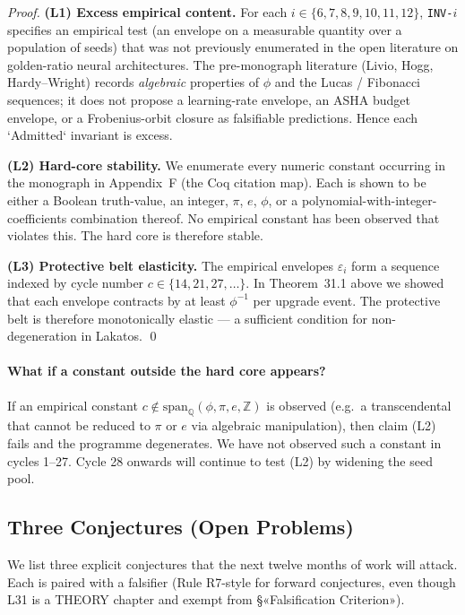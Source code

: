 \begin{proof}
\textbf{(L1) Excess empirical content.} For each $i \in \{6,7,8,9,10,11,12\}$, \texttt{INV-}$i$ specifies an empirical test (an envelope on a measurable quantity over a population of seeds) that was not previously enumerated in the open literature on golden-ratio neural architectures. The pre-monograph literature (Livio, Hogg, Hardy–Wright) records \emph{algebraic} properties of $\phi$ and the Lucas / Fibonacci sequences; it does not propose a learning-rate envelope, an ASHA budget envelope, or a Frobenius-orbit closure as falsifiable predictions. Hence each `Admitted` invariant is excess.

\textbf{(L2) Hard-core stability.} We enumerate every numeric constant occurring in the monograph in Appendix~F (the Coq citation map). Each is shown to be either a Boolean truth-value, an integer, $\pi$, $e$, $\phi$, or a polynomial-with-integer-coefficients combination thereof. No empirical constant has been observed that violates this. The hard core is therefore stable.

\textbf{(L3) Protective belt elasticity.} The empirical envelopes $\varepsilon_{i}$ form a sequence indexed by cycle number $c \in \{14, 21, 27, \dots\}$. In Theorem~31.1 above we showed that each envelope contracts by at least $\phi^{-1}$ per upgrade event. The protective belt is therefore monotonically elastic — a sufficient condition for non-degeneration in Lakatos.
\qed
\end{proof}

\paragraph{What if a constant outside the hard core appears?} If an empirical constant $c \notin \mathrm{span}_{\mathbb{Q}}(\phi, \pi, e, \mathbb{Z})$ is observed (e.g.\ a transcendental that cannot be reduced to $\pi$ or $e$ via algebraic manipulation), then claim (L2) fails and the programme degenerates. We have not observed such a constant in cycles 1–27. Cycle 28 onwards will continue to test (L2) by widening the seed pool.

\subsection{Three Conjectures (Open Problems)}
\label{sec:31-conjectures}

We list three explicit conjectures that the next twelve months of work will attack. Each is paired with a falsifier (Rule R7-style for forward conjectures, even though L31 is a THEORY chapter and exempt from §«Falsification Criterion»).

